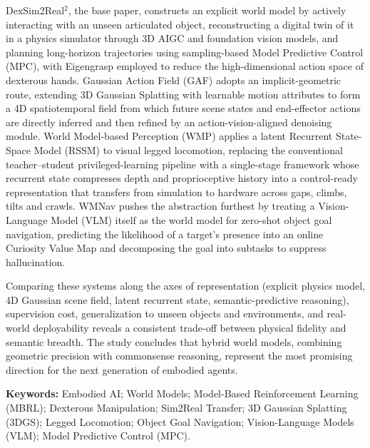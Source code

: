 \documentclass[12pt,a4paper,final]{extreport}
\begin{document}
DexSim2Real$^{2}$, the base paper, constructs an explicit world model by actively interacting with an unseen articulated object, reconstructing a digital twin of it in a physics simulator through 3D AIGC and foundation vision models, and planning long-horizon trajectories using sampling-based Model Predictive Control (MPC), with Eigengrasp employed to reduce the high-dimensional action space of dexterous hands. Gaussian Action Field (GAF) adopts an implicit-geometric route, extending 3D Gaussian Splatting with learnable motion attributes to form a 4D spatiotemporal field from which future scene states and end-effector actions are directly inferred and then refined by an action-vision-aligned denoising module. World Model-based Perception (WMP) applies a latent Recurrent State-Space Model (RSSM) to visual legged locomotion, replacing the conventional teacher--student privileged-learning pipeline with a single-stage framework whose recurrent state compresses depth and proprioceptive history into a control-ready representation that transfers from simulation to hardware across gaps, climbs, tilts and crawls. WMNav pushes the abstraction furthest by treating a Vision-Language Model (VLM) itself as the world model for zero-shot object goal navigation, predicting the likelihood of a target's presence into an online Curiosity Value Map and decomposing the goal into subtasks to suppress hallucination.

Comparing these systems along the axes of representation (explicit physics model, 4D Gaussian scene field, latent recurrent state, semantic-predictive reasoning), supervision cost, generalization to unseen objects and environments, and real-world deployability reveals a consistent trade-off between physical fidelity and semantic breadth. The study concludes that hybrid world models, combining geometric precision with commonsense reasoning, represent the most promising direction for the next generation of embodied agents.

\vspace{0.5cm}
\noindent
\textbf{Keywords:} Embodied AI; World Models; Model-Based Reinforcement Learning (MBRL); Dexterous Manipulation; Sim2Real Transfer; 3D Gaussian Splatting (3DGS); Legged Locomotion; Object Goal Navigation; Vision-Language Models (VLM); Model Predictive Control (MPC).
\endgroup

\newpage

\thispagestyle{plain}
\begingroup
{}
\tableofcontents
\endgroup
\begingroup
{}
\listoffigures
{}
\listoftables
{}
\endgroup
\end{document}

